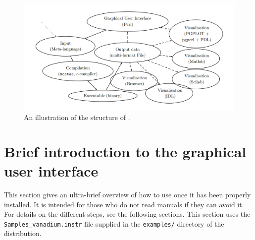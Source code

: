 \begin{figure}[htb!]
\begin{center}
\includegraphics[width=\textwidth]{figures/mcstas_software_png.png}
\end{center}
\caption{An illustration of the structure of \MCS .}
\label{fig:structure}
\end{figure}

\section{Brief introduction to the graphical user interface}
\label{s:brief}

This section gives an ultra-brief overview of how to use \MCS once it
has been properly installed. It is intended for those who do not read
manuals if they can avoid it. For details on the different steps, see
the following sections. This section uses the
\verb+Samples_vanadium.instr+ file supplied in the \verb+examples/+
directory of the \MCS distribution. %

